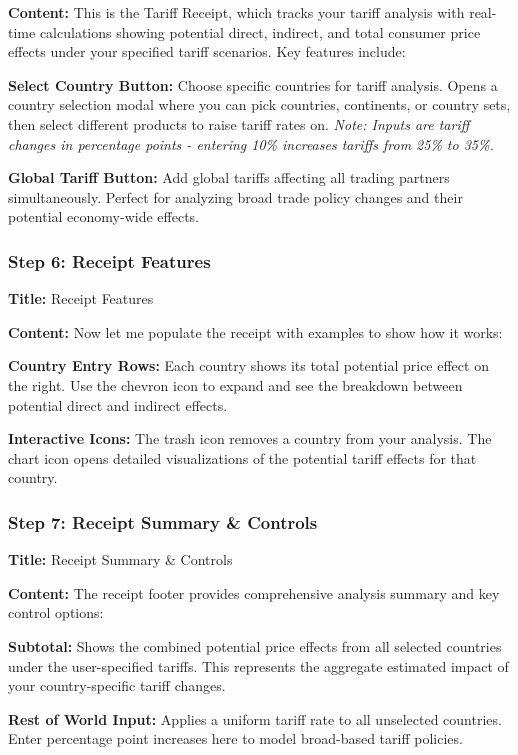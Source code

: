 \documentclass[11pt]{article}
\begin{document}
\textbf{Content:} This is the Tariff Receipt, which tracks your tariff analysis with real-time calculations showing potential direct, indirect, and total consumer price effects under your specified tariff scenarios. Key features include:

\textbf{Select Country Button:} Choose specific countries for tariff analysis. Opens a country selection modal where you can pick countries, continents, or country sets, then select different products to raise tariff rates on. \textit{Note: Inputs are tariff changes in percentage points - entering 10\% increases tariffs from 25\% to 35\%.}

\textbf{Global Tariff Button:} Add global tariffs affecting all trading partners simultaneously. Perfect for analyzing broad trade policy changes and their potential economy-wide effects.

\subsubsection{Step 6: Receipt Features}
\textbf{Title:} Receipt Features

\textbf{Content:} Now let me populate the receipt with examples to show how it works:

\textbf{Country Entry Rows:} Each country shows its total potential price effect on the right. Use the chevron icon to expand and see the breakdown between potential direct and indirect effects.

\textbf{Interactive Icons:} The trash icon removes a country from your analysis. The chart icon opens detailed visualizations of the potential tariff effects for that country.

\subsubsection{Step 7: Receipt Summary \& Controls}
\textbf{Title:} Receipt Summary \& Controls

\textbf{Content:} The receipt footer provides comprehensive analysis summary and key control options:

\textbf{Subtotal:} Shows the combined potential price effects from all selected countries under the user-specified tariffs. This represents the aggregate estimated impact of your country-specific tariff changes.

\textbf{Rest of World Input:} Applies a uniform tariff rate to all unselected countries. Enter percentage point increases here to model broad-based tariff policies.
\end{document}
